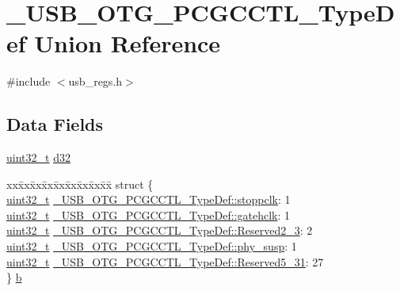 \hypertarget{union___u_s_b___o_t_g___p_c_g_c_c_t_l___type_def}{\section{\-\_\-\-U\-S\-B\-\_\-\-O\-T\-G\-\_\-\-P\-C\-G\-C\-C\-T\-L\-\_\-\-Type\-Def Union Reference}
\label{union___u_s_b___o_t_g___p_c_g_c_c_t_l___type_def}
}


{\ttfamily \#include $<$usb\-\_\-regs.\-h$>$}

\subsection*{Data Fields}
\begin{DoxyCompactItemize}
\item 
\hyperlink{stdint_8h_a435d1572bf3f880d55459d9805097f62}{uint32\-\_\-t} \hyperlink{group___u_s_b___o_t_g___d_r_i_v_e_r_ga2e1fd814ad3ab867005461a0766b0ae4}{d32}
\item 
\begin{tabbing}
xx\=xx\=xx\=xx\=xx\=xx\=xx\=xx\=xx\=\kill
struct \{\\
\>\hyperlink{stdint_8h_a435d1572bf3f880d55459d9805097f62}{uint32\_t} \hyperlink{group___u_s_b___o_t_g___d_r_i_v_e_r_gada5828fd50c36f5120978fa214b87dda}{\_USB\_OTG\_PCGCCTL\_TypeDef::stoppclk}: 1\\
\>\hyperlink{stdint_8h_a435d1572bf3f880d55459d9805097f62}{uint32\_t} \hyperlink{group___u_s_b___o_t_g___d_r_i_v_e_r_gae554e8c7914ce8d2eb106586fdbbc76d}{\_USB\_OTG\_PCGCCTL\_TypeDef::gatehclk}: 1\\
\>\hyperlink{stdint_8h_a435d1572bf3f880d55459d9805097f62}{uint32\_t} \hyperlink{group___u_s_b___o_t_g___d_r_i_v_e_r_gabc16bbefeb0572fe4e11610b2b65edf9}{\_USB\_OTG\_PCGCCTL\_TypeDef::Reserved2\_3}: 2\\
\>\hyperlink{stdint_8h_a435d1572bf3f880d55459d9805097f62}{uint32\_t} \hyperlink{group___u_s_b___o_t_g___d_r_i_v_e_r_ga535f75e5436b75614c13d56c654a2b49}{\_USB\_OTG\_PCGCCTL\_TypeDef::phy\_susp}: 1\\
\>\hyperlink{stdint_8h_a435d1572bf3f880d55459d9805097f62}{uint32\_t} \hyperlink{group___u_s_b___o_t_g___d_r_i_v_e_r_ga0a01d405634299e9f2312062b60786ba}{\_USB\_OTG\_PCGCCTL\_TypeDef::Reserved5\_31}: 27\\
\} \hyperlink{group___u_s_b___o_t_g___d_r_i_v_e_r_gab399c7093c52f61852ba9075ffda4665}{b}\\

\end{tabbing}\end{DoxyCompactItemize}


